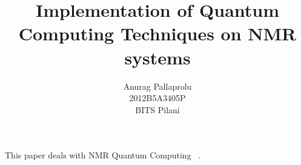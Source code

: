\documentclass[12pt]{article}
\begin{document}
\title{Implementation of Quantum Computing Techniques on NMR systems}
\author{Anurag Pallaprolu \\ 2012B5A3405P \\ BITS Pilani }
\maketitle

This paper deals with NMR Quantum Computing ~\cite{Nobody06}.


\end{document}
